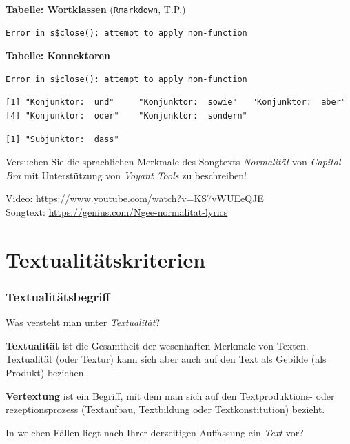 \documentclass[
  letterpaper,
  DIV=11,
  numbers=noendperiod]{scrreprt}
\begin{document}
\textbf{Tabelle: Wortklassen} (\texttt{Rmarkdown}, T.P.)

\begin{verbatim}
Error in s$close(): attempt to apply non-function
\end{verbatim}

\textbf{Tabelle: Konnektoren}

\begin{verbatim}
Error in s$close(): attempt to apply non-function
\end{verbatim}

\begin{verbatim}
[1] "Konjunktor:  und"     "Konjunktor:  sowie"   "Konjunktor:  aber"   
[4] "Konjunktor:  oder"    "Konjunktor:  sondern"
\end{verbatim}

\begin{verbatim}
[1] "Subjunktor:  dass"
\end{verbatim}

Versuchen Sie die sprachlichen Merkmale des Songtexts \emph{Normalität}
von \emph{Capital Bra} mit Unterstützung von \emph{Voyant Tools} zu
beschreiben!

Video: \url{https://www.youtube.com/watch?v=KS7vWUEeQJE}\\
Songtext: \url{https://genius.com/Ngee-normalitat-lyrics}


\hypertarget{sec-textkriterien}{%
\chapter{Textualitätskriterien}\label{sec-textkriterien}}

\hypertarget{textualituxe4tsbegriff}{%
\subsection{Textualitätsbegriff}\label{textualituxe4tsbegriff}}

Was versteht man unter \emph{Textualität}?

\textbf{Textualität} ist die Gesamtheit der wesenhaften Merkmale von
Texten. Textualität (oder Textur) kann sich aber auch auf den Text als
Gebilde (als Produkt) beziehen.

\textbf{Vertextung} ist ein Begriff, mit dem man sich auf den
Textproduktions- oder rezeptionsprozess (Textaufbau, Textbildung oder
Textkonstitution) bezieht.

In welchen Fällen liegt nach Ihrer derzeitigen Auffassung ein
\emph{Text} vor?
\end{document}
